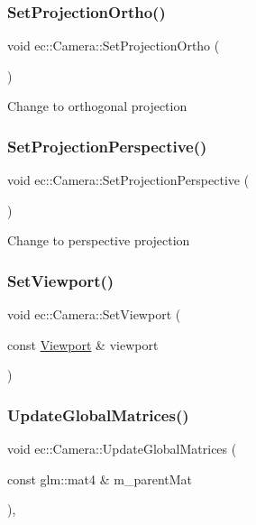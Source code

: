 \subsubsection{\texorpdfstring{Set\+Projection\+Ortho()}{SetProjectionOrtho()}}
{\footnotesize\ttfamily void ec\+::\+Camera\+::\+Set\+Projection\+Ortho (\begin{DoxyParamCaption}{ }\end{DoxyParamCaption})}

Change to orthogonal projection \mbox{\label{classec_1_1_camera_a5d6b64ba57b209cca822f4ca9e278a44}} 
\subsubsection{\texorpdfstring{Set\+Projection\+Perspective()}{SetProjectionPerspective()}}
{\footnotesize\ttfamily void ec\+::\+Camera\+::\+Set\+Projection\+Perspective (\begin{DoxyParamCaption}{ }\end{DoxyParamCaption})}

Change to perspective projection \mbox{\label{classec_1_1_camera_a30dab960758a3614624cada979abdd5a}} 
\subsubsection{\texorpdfstring{Set\+Viewport()}{SetViewport()}}
{\footnotesize\ttfamily void ec\+::\+Camera\+::\+Set\+Viewport (\begin{DoxyParamCaption}\item[{const \mbox{\hyperlink{classec_1_1_viewport}{Viewport}} \&}]{viewport }\end{DoxyParamCaption})}

\mbox{\label{classec_1_1_camera_abbdd88f9b352d34fef473064e2ccd625}} 
\subsubsection{\texorpdfstring{Update\+Global\+Matrices()}{UpdateGlobalMatrices()}}
{\footnotesize\ttfamily void ec\+::\+Camera\+::\+Update\+Global\+Matrices (\begin{DoxyParamCaption}\item[{const glm\+::mat4 \&}]{m\+\_\+parent\+Mat }\end{DoxyParamCaption})\hspace{0.3cm}{\ttfamily [override]}, {\ttfamily [virtual]}}

